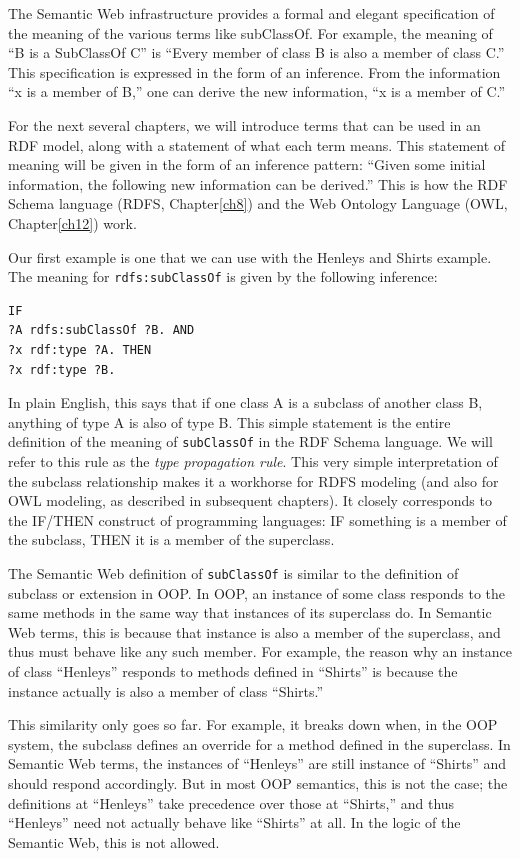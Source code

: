 The Semantic Web infrastructure provides a formal and elegant
specification of the meaning of the various terms like subClassOf. For
example, the meaning of ``B is a SubClassOf C'' is ``Every member of
class B is also a member of class C.'' This specification is expressed
in the form of an inference. From the information ``x is a member of
B,'' one can derive the new information, ``x is a member of C.''

For the next several chapters, we will introduce terms that can be used
in an RDF model, along with a statement of what each term means. This
statement of meaning will be given in the form of an inference pattern:
``Given some initial information, the following new information can be
derived.'' This is how the RDF Schema language (RDFS, Chapter\ref{ch8}) and the
Web Ontology Language (OWL, Chapter\ref{ch12}) work.

Our first example is one that we can use with the Henleys and Shirts
example. The meaning for
\texttt{rdfs:subClassOf} is given by the following inference:

\begin{lstlisting}
IF
?A rdfs:subClassOf ?B. AND
?x rdf:type ?A. THEN
?x rdf:type ?B.
\end{lstlisting}

In plain English, this says that if one class A is a subclass of another
class B, anything of type A is also of type B. This simple statement is
the entire definition of the meaning of \texttt{subClassOf} in the RDF Schema
language. We will refer to this rule as the \emph{type propagation
rule}. This very simple interpretation of the subclass relationship
makes it a workhorse for RDFS modeling (and also for OWL modeling, as
described in subsequent chapters). It closely corresponds to the IF/THEN
construct of programming languages: IF something is a member of the
subclass, THEN it is a member of the superclass.

\begin{sidebar}{}
The Semantic Web definition of \texttt{subClassOf} is similar to the definition
of subclass or extension in OOP. In OOP, an instance of some class
responds to the same methods in the same way that instances of its
superclass do. In Semantic Web terms, this is because that instance is
also a member of the superclass, and thus must behave like any such
member. For example, the reason why an instance of class ``Henleys''
responds to methods defined in ``Shirts'' is because the instance
actually is also a member of class ``Shirts.''

This similarity only goes so far. For example, it breaks down when, in
the OOP system, the subclass defines an override for a method defined in
the superclass. In Semantic Web terms, the instances of ``Henleys'' are
still instance of ``Shirts'' and should respond accordingly. But in most
OOP semantics, this is not the case; the definitions at ``Henleys'' take
precedence over those at ``Shirts,'' and thus ``Henleys'' need not
actually behave like ``Shirts'' at all. In the logic of the Semantic
Web, this is not allowed.
\end{sidebar}

